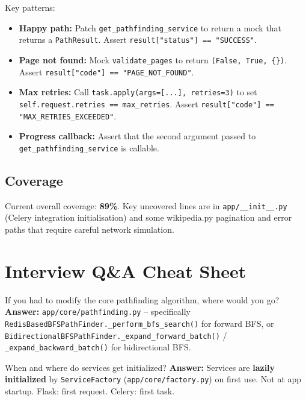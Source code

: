\documentclass[11pt,a4paper]{article}
\begin{document}
Key patterns:
\begin{itemize}[leftmargin=*]
    \item \textbf{Happy path:} Patch \texttt{get\_pathfinding\_service} to return a mock that returns a \texttt{PathResult}. Assert \texttt{result["status"] == "SUCCESS"}.
    \item \textbf{Page not found:} Mock \texttt{validate\_pages} to return \texttt{(False, True, \{\})}. Assert \texttt{result["code"] == "PAGE\_NOT\_FOUND"}.
    \item \textbf{Max retries:} Call \texttt{task.apply(args=[...], retries=3)} to set \texttt{self.request.retries == max\_retries}. Assert \texttt{result["code"] == "MAX\_RETRIES\_EXCEEDED"}.
    \item \textbf{Progress callback:} Assert that the second argument passed to \texttt{get\_pathfinding\_service} is callable.
\end{itemize}

\subsection{Coverage}

Current overall coverage: \textbf{89\%}. Key uncovered lines are in \texttt{app/\_\_init\_\_.py} (Celery integration initialisation) and some wikipedia.py pagination and error paths that require careful network simulation.

\section{Interview Q\&A Cheat Sheet}

\begin{qabox}{If you had to modify the core pathfinding algorithm, where would you go?}
\textbf{Answer:} \texttt{app/core/pathfinding.py} -- specifically \texttt{RedisBasedBFSPathFinder.\_perform\_bfs\_search()} for forward BFS, or \texttt{BidirectionalBFSPathFinder.\_expand\_forward\_batch()} / \texttt{\_expand\_backward\_batch()} for bidirectional BFS.
\end{qabox}

\begin{qabox}{When and where do services get initialized?}
\textbf{Answer:} Services are \textbf{lazily initialized} by \texttt{ServiceFactory} (\texttt{app/core/factory.py}) on first use. Not at app startup. Flask: first request. Celery: first task.
\end{qabox}
\end{document}
